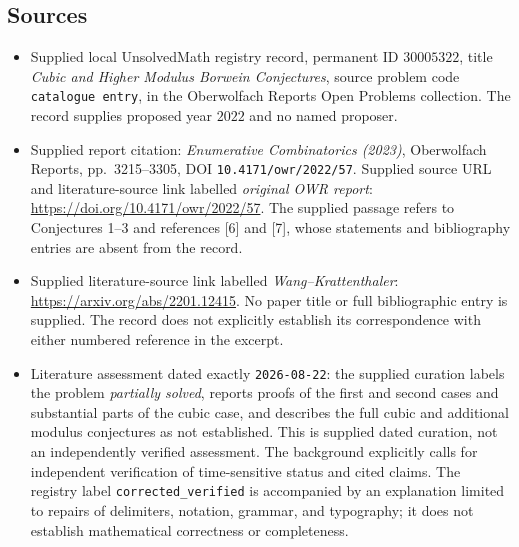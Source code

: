\documentclass[11pt]{article}
\begin{document}
\subsection{Sources}
\begin{itemize}
\item Supplied local UnsolvedMath registry record, permanent ID \(30005322\), title \emph{Cubic and Higher Modulus Borwein Conjectures}, source problem code \texttt{catalogue entry}, in the Oberwolfach Reports Open Problems collection. The record supplies proposed year \(2022\) and no named proposer.
\item Supplied report citation: \emph{Enumerative Combinatorics (2023)}, Oberwolfach Reports, pp.~3215--3305, DOI \texttt{10.4171/owr/2022/57}. Supplied source URL and literature-source link labelled \emph{original OWR report}: \url{https://doi.org/10.4171/owr/2022/57}. The supplied passage refers to Conjectures 1--3 and references [6] and [7], whose statements and bibliography entries are absent from the record.
\item Supplied literature-source link labelled \emph{Wang--Krattenthaler}: \url{https://arxiv.org/abs/2201.12415}. No paper title or full bibliographic entry is supplied. The record does not explicitly establish its correspondence with either numbered reference in the excerpt.
\item Literature assessment dated exactly \texttt{2026-08-22}: the supplied curation labels the problem \emph{partially solved}, reports proofs of the first and second cases and substantial parts of the cubic case, and describes the full cubic and additional modulus conjectures as not established. This is supplied dated curation, not an independently verified assessment. The background explicitly calls for independent verification of time-sensitive status and cited claims. The registry label \texttt{corrected\_verified} is accompanied by an explanation limited to repairs of delimiters, notation, grammar, and typography; it does not establish mathematical correctness or completeness.
\end{itemize}
\end{document}
